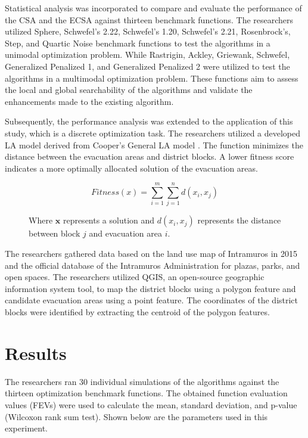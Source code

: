 \documentclass{article}
\begin{document}
Statistical analysis was incorporated to compare and evaluate the performance of the CSA and the ECSA against thirteen benchmark functions. The researchers utilized Sphere, Schwefel’s 2.22, Schwefel’s 1.20, Schwefel’s 2.21, Rosenbrock’s, Step, and Quartic Noise benchmark functions to test the algorithms in a unimodal optimization problem. While Rastrigin, Ackley, Griewank, Schwefel, Generalized Penalized 1, and Generalized Penalized 2 were utilized to test the algorithms in a multimodal optimization problem. These functions aim to assess the local and global searchability of the algorithms and validate the enhancements made to the existing algorithm.

Subsequently, the performance analysis was extended to the application of this study, which is a discrete optimization task. The researchers utilized a developed LA model derived from Cooper’s General LA model \cite{azarmand2009location}. The function minimizes the distance between the evacuation areas and district blocks. A lower fitness score indicates a more optimally allocated solution of the evacuation areas.

\begin{figure}[htbp]
    \centering
    \begin{equation}
        \textit{Fitness}(x) = \sum_{i=1}^{m} \sum_{j=1}^{n} d(x_i, x_j)
    \end{equation}
    \caption{Where \(\mathbf{x}\) represents a solution and \( d(x_i, x_j) \) represents the distance between block \( j \) and evacuation area \( i \).}
\end{figure}

The researchers gathered data based on the land use map of Intramuros in 2015 and the official database of the Intramuros Administration for plazas, parks, and open spaces. The researchers utilized QGIS, an open-source geographic information system tool, to map the district blocks using a polygon feature and candidate evacuation areas using a point feature. The coordinates of the district blocks were identified by extracting the centroid of the polygon features.

\section{Results}

The researchers ran 30 individual simulations of the algorithms against the thirteen optimization benchmark functions. The obtained function evaluation values (FEVs) were used to calculate the mean, standard deviation, and p-value (Wilcoxon rank sum test). Shown below are the parameters used in this experiment.
\end{document}

